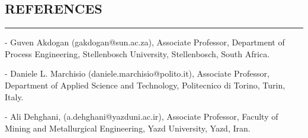\documentclass[10pt,a4]{article}
\begin{document}
\begin{small}







\end{small}

\subsection*{REFERENCES}
\hrule
\vspace{0.2cm}

\begin{list}{}{}
\item - Guven Akdogan (gakdogan@sun.ac.za), Associate Professor, Department of Process Engineering, Stellenbosch University, Stellenbosch, South Africa.
\item - Daniele L. Marchisio (daniele.marchisio@polito.it), Associate Professor, Department of Applied Science and Technology, Politecnico di Torino, Turin, Italy.
\item - Ali Dehghani, (a.dehghani@yazduni.ac.ir), Associate Professor, Faculty of Mining and Metallurgical Engineering, Yazd University, Yazd, Iran.
\end{list}
\end{document}
